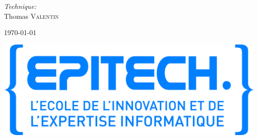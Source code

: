 \begin{titlepage}
\begin{center}
\begin{multicols}{3}
      \emph{Technique:} \\
      Thomas \textsc{Valentin} \\
   \end{multicols}

    \vfill

    {\large \today}

  \end{center}

  \begin{flushright}
    \vspace{1cm}
    \includegraphics[scale=0.03]{Logo-Epitech}
  \end{flushright}

\end{titlepage}


